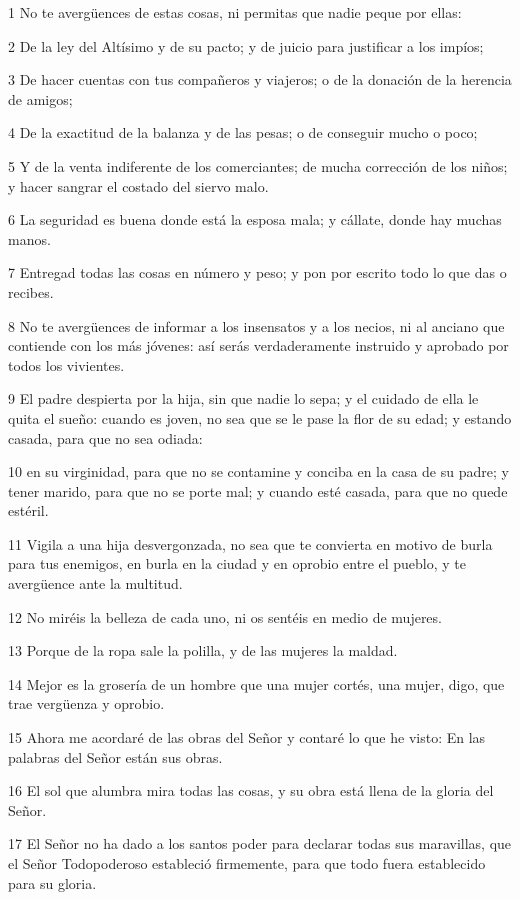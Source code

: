 \par 1 No te avergüences de estas cosas, ni permitas que nadie peque por ellas:
\par 2 De la ley del Altísimo y de su pacto; y de juicio para justificar a los impíos;
\par 3 De hacer cuentas con tus compañeros y viajeros; o de la donación de la herencia de amigos;
\par 4 De la exactitud de la balanza y de las pesas; o de conseguir mucho o poco;
\par 5 Y de la venta indiferente de los comerciantes; de mucha corrección de los niños; y hacer sangrar el costado del siervo malo.
\par 6 La seguridad es buena donde está la esposa mala; y cállate, donde hay muchas manos.
\par 7 Entregad todas las cosas en número y peso; y pon por escrito todo lo que das o recibes.
\par 8 No te avergüences de informar a los insensatos y a los necios, ni al anciano que contiende con los más jóvenes: así serás verdaderamente instruido y aprobado por todos los vivientes.
\par 9 El padre despierta por la hija, sin que nadie lo sepa; y el cuidado de ella le quita el sueño: cuando es joven, no sea que se le pase la flor de su edad; y estando casada, para que no sea odiada:
\par 10 en su virginidad, para que no se contamine y conciba en la casa de su padre; y tener marido, para que no se porte mal; y cuando esté casada, para que no quede estéril.
\par 11 Vigila a una hija desvergonzada, no sea que te convierta en motivo de burla para tus enemigos, en burla en la ciudad y en oprobio entre el pueblo, y te avergüence ante la multitud.
\par 12 No miréis la belleza de cada uno, ni os sentéis en medio de mujeres.
\par 13 Porque de la ropa sale la polilla, y de las mujeres la maldad.
\par 14 Mejor es la grosería de un hombre que una mujer cortés, una mujer, digo, que trae vergüenza y oprobio.
\par 15 Ahora me acordaré de las obras del Señor y contaré lo que he visto: En las palabras del Señor están sus obras.
\par 16 El sol que alumbra mira todas las cosas, y su obra está llena de la gloria del Señor.
\par 17 El Señor no ha dado a los santos poder para declarar todas sus maravillas, que el Señor Todopoderoso estableció firmemente, para que todo fuera establecido para su gloria.
